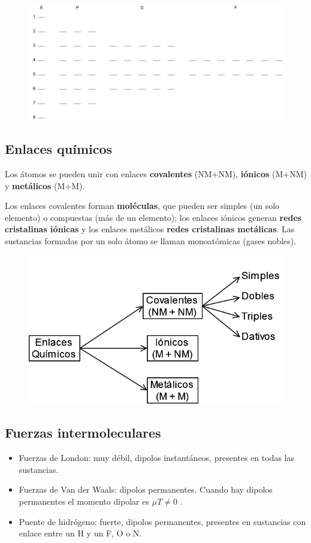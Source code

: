 \begin{figure}[H]
    \centering
    \includegraphics[width=0.8\linewidth]{Images/orbitales.png}
\end{figure}


\subsection*{Enlaces químicos}

Los átomos se pueden unir con enlaces \textbf{covalentes} (NM+NM), \textbf{iónicos} (M+NM) y \textbf{metálicos} (M+M). 

\sskip 
Los enlaces covalentes forman \textbf{moléculas}, que pueden ser simples (un solo elemento) o compuestas (más de un elemento); los enlaces iónicos generan \textbf{redes cristalinas iónicas} y los enlaces metálicos \textbf{redes cristalinas metálicas}. Las sustancias formadas por un solo átomo se llaman monoatómicas (gases nobles).

\begin{figure}[H]
    \centering
    \includegraphics[width=0.7\linewidth]{Images/enlaces_quimicos.png}
\end{figure}


\subsection*{Fuerzas intermoleculares}

\begin{itemize}
    \item Fuerzas de London: muy débil, dipolos instantáneos, presentes en todas las sustancias.

    \item Fuerzas de Van der Waals: dipolos permanentes. Cuando hay dipolos permanentes el momento dipolar es $\mu T\neq 0$ .

    \item Puente de hidrógeno: fuerte, dipolos permanentes, presentes en sustancias con enlace entre un H y un F, O o N.
\end{itemize}


